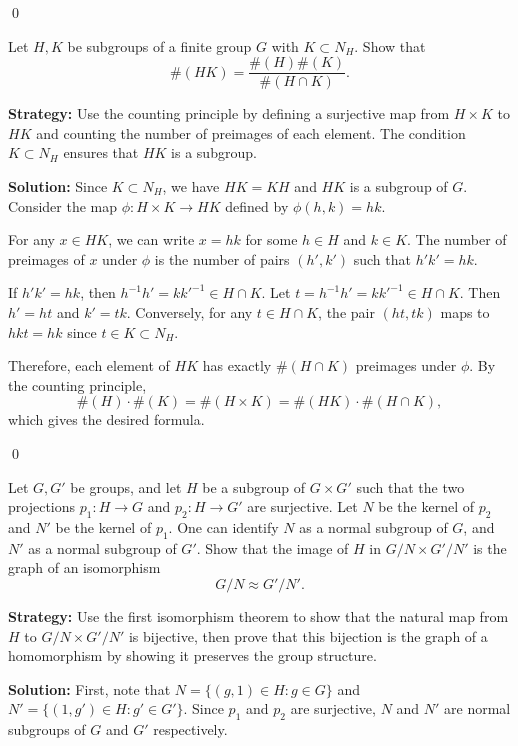 \qed
\begin{problembox}
Let $H, K$ be subgroups of a finite group $G$ with $K \subset N_H$. Show that
\[\#(HK) = \frac{\#(H)\#(K)}{\#(H \cap K)}.\]
\end{problembox}

\noindent\textbf{Strategy:} Use the counting principle by defining a surjective map from $H \times K$ to $HK$ and counting the number of preimages of each element. The condition $K \subset N_H$ ensures that $HK$ is a subgroup.

\noindent\textbf{Solution:} Since $K \subset N_H$, we have $HK = KH$ and $HK$ is a subgroup of $G$. Consider the map $\phi: H \times K \to HK$ defined by $\phi(h,k) = hk$.

For any $x \in HK$, we can write $x = hk$ for some $h \in H$ and $k \in K$. The number of preimages of $x$ under $\phi$ is the number of pairs $(h',k')$ such that $h'k' = hk$.

If $h'k' = hk$, then $h^{-1}h' = kk'^{-1} \in H \cap K$. Let $t = h^{-1}h' = kk'^{-1} \in H \cap K$. Then $h' = ht$ and $k' = tk$. Conversely, for any $t \in H \cap K$, the pair $(ht, tk)$ maps to $hkt = hk$ since $t \in K \subset N_H$.

Therefore, each element of $HK$ has exactly $\#(H \cap K)$ preimages under $\phi$. By the counting principle,
\[\#(H) \cdot \#(K) = \#(H \times K) = \#(HK) \cdot \#(H \cap K),\]
which gives the desired formula.


\qed
\begin{problembox}
Let $G, G'$ be groups, and let $H$ be a subgroup of $G \times G'$ such that the two projections $p_1 : H \rightarrow G$ and $p_2 : H \rightarrow G'$ are surjective. Let $N$ be the kernel of $p_2$ and $N'$ be the kernel of $p_1$. One can identify $N$ as a normal subgroup of $G$, and $N'$ as a normal subgroup of $G'$. Show that the image of $H$ in $G/N \times G'/N'$ is the graph of an isomorphism
\[G/N \approx G'/N'.\]
\end{problembox}

\noindent\textbf{Strategy:} Use the first isomorphism theorem to show that the natural map from $H$ to $G/N \times G'/N'$ is bijective, then prove that this bijection is the graph of a homomorphism by showing it preserves the group structure.

\noindent\textbf{Solution:} First, note that $N = \{(g,1) \in H : g \in G\}$ and $N' = \{(1,g') \in H : g' \in G'\}$. Since $p_1$ and $p_2$ are surjective, $N$ and $N'$ are normal subgroups of $G$ and $G'$ respectively.

